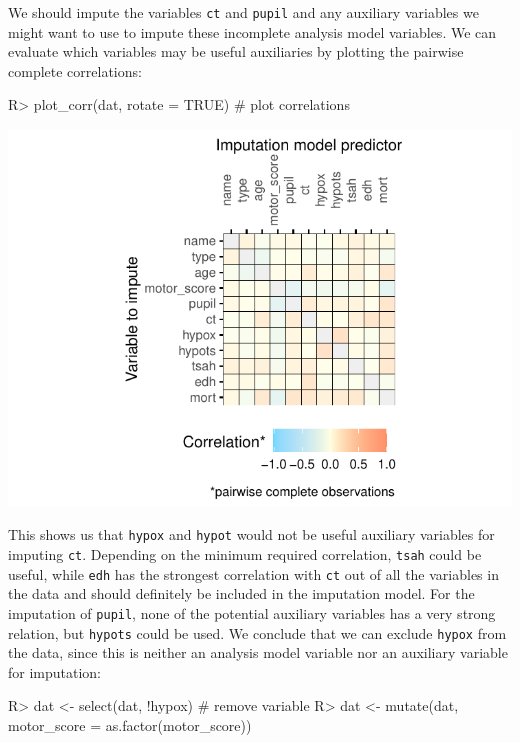 \documentclass[
]{jss}
\begin{document}
We should impute the variables \texttt{ct} and \texttt{pupil} and any
auxiliary variables we might want to use to impute these incomplete
analysis model variables. We can evaluate which variables may be useful
auxiliaries by plotting the pairwise complete correlations:

\begin{CodeChunk}
\begin{CodeInput}
R> plot_corr(dat, rotate = TRUE) # plot correlations 
\end{CodeInput}


\begin{center}\includegraphics{Imputation_of_Incomplete_Multilevel_Data_files/figure-latex/impact_corr-1} \end{center}

\end{CodeChunk}

This shows us that \texttt{hypox} and \texttt{hypot} would not be useful
auxiliary variables for imputing \texttt{ct}. Depending on the minimum
required correlation, \texttt{tsah} could be useful, while \texttt{edh}
has the strongest correlation with \texttt{ct} out of all the variables
in the data and should definitely be included in the imputation model.
For the imputation of \texttt{pupil}, none of the potential auxiliary
variables has a very strong relation, but \texttt{hypots} could be used.
We conclude that we can exclude \texttt{hypox} from the data, since this
is neither an analysis model variable nor an auxiliary variable for
imputation:

\begin{CodeChunk}
\begin{CodeInput}
R> dat <- select(dat, !hypox)  # remove variable
R> dat <- mutate(dat, motor_score = as.factor(motor_score))
\end{CodeInput}
\end{CodeChunk}
\end{document}
